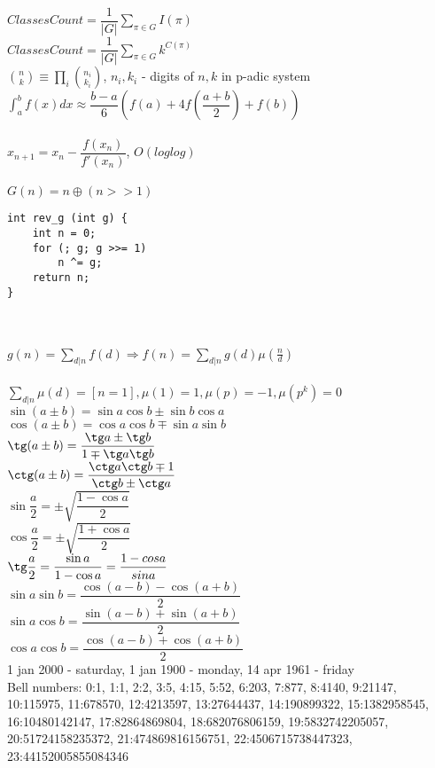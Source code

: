 $ClassesCount = \dfrac{1}{|G|} \sum_{\pi \in G} I(\pi)$\\
$ClassesCount = \dfrac{1}{|G|} \sum_{\pi \in G} k^{C(\pi)}$\\
$\binom{n}{k} \equiv \prod_{i}\binom{n_i}{k_i}$, $n_i, k_i$ - digits of $n,k$ in p-adic system
\\
$\int_{a}^{b}f(x)dx \approx \dfrac{b-a}{6}(f(a) + 4f(\dfrac{a+b}
{2})+f(b))$\\
\\
$x_{n+1} = x_n - \dfrac{f(x_n)}{f'(x_n)}$, $O(loglog)$\\
\\
$G(n) = n \oplus (n >> 1)$\\
\begin{lstlisting}
int rev_g (int g) {
	int n = 0;
	for (; g; g >>= 1)
		n ^= g;
	return n;
}
\end{lstlisting}\\
\\
$g(n) = \sum_{d|n} f(d) \Rightarrow f(n) = \sum_{d|n} g(d) \mu(\frac{n}{d})$\\\\
$\sum_{d|n} \mu(d) = [n = 1],   \mu(1) = 1, \mu(p) = -1, \mu(p^k) = 0$\\
$\sin(a \pm b) = \sin a \cos b \pm \sin b \cos a$\\
$\cos(a \pm b) = \cos a \cos b \mp \sin a \sin b$\\
$\tg(a\pm b) = \dfrac{\tg a \pm \tg b}{1 \mp \tg a \tg b}$\\
$\ctg(a \pm b) = \dfrac{\ctg a \ctg b \mp 1}{\ctg b \pm \ctg a}$\\
$\sin \dfrac{a}{2} = \pm \sqrt{\dfrac{1-\cos a}{2}}$\\
$\cos \dfrac{a}{2} = \pm \sqrt{\dfrac{1+\cos a}{2}}$\\
$\tg \dfrac{a}{2} = \dfrac{\sin a}{1 - \cos a} = \dfrac{1 - cos a}{sin a}$\\
$\sin a \sin b = \dfrac{\cos(a-b) - \cos(a+b)}{2}$\\
$\sin a \cos b = \dfrac{\sin(a-b) + \sin(a+b)}{2}$\\
$\cos a \cos b = \dfrac{\cos(a-b) + \cos(a+b)}{2}$\\
1 jan 2000 - saturday, 1 jan 1900 - monday, 14 apr 1961 - friday\\
Bell numbers: 0:1, 1:1, 2:2, 3:5, 4:15, 5:52, 6:203, 7:877, 8:4140, 9:21147, 10:115975, 11:678570, 12:4213597,
13:27644437, 14:190899322, 15:1382958545, 16:10480142147, 17:82864869804, 18:682076806159, 19:5832742205057,
20:51724158235372, 21:474869816156751, 22:4506715738447323, 23:44152005855084346\\